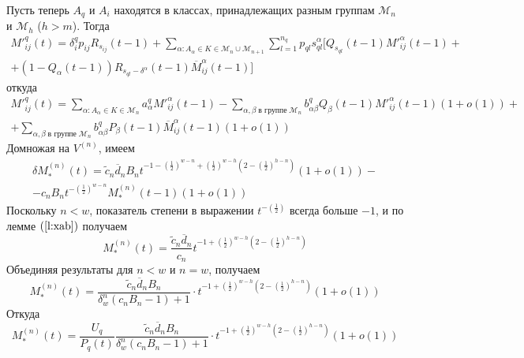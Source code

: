 \documentclass[12pt]{article}
\begin{document}
Пусть теперь $A_q$ и $A_i$ находятся в классах, принадлежащих разным группам $\mathcal{M}_n$ и $\mathcal{M}_h$ ($h > m$). Тогда
\begin{multline*}
	M'^q_{ij}(t) = \delta^q_i p_{ij} R_{s_{ij}}(t-1) + \sum_{\alpha: A_\alpha \in K \in \mathcal{M}_n \cup \mathcal{M}_{n+1}} \sum_{l=1}^{n_q} p_{ql} s_{ql}^\alpha [Q_{s_{ql}}(t-1) M'^\alpha_{ij}(t-1) + \\
	+ (1 - Q_\alpha(t-1)) R_{s_{ql} - \delta^\alpha}(t-1) \overline{M}^{\alpha}_{ij}(t-1)]
\end{multline*}
откуда
\begin{multline*}
	M'^q_{ij}(t) = \sum_{\alpha : A_\alpha \in K \in \mathcal{M}_n} a^q_\alpha M'^\alpha_{ij}(t-1) - \sum_{\alpha,\beta\; \text{в группе}\; \mathcal{M}_n} b^q_{\alpha \beta} Q_\beta(t-1) M'^\alpha_{ij}(t-1) (1 + o(1)) + \\
	+ \sum_{\alpha,\beta\; \text{в группе}\; \mathcal{M}_n} b^q_{\alpha \beta} P_\beta(t-1) \overline{M}^\alpha_{ij}(t-1) (1 + o(1))
\end{multline*}
Домножая на $V^{(n)}$, имеем
\begin{multline*}
	\delta M^{(n)}_*(t) = \tilde{c}_n \overline{d}_n B_n t^{-1 -\left(\frac{1}{2}\right)^{w-n} + \left(\frac{1}{2}\right)^{w-h} \left(2 - \left(\frac{1}{2}\right)^{h - n}\right)} (1 + o(1)) - \\
	- c_n B_n t^{-\left(\frac{1}{2}\right)^{w-n}} M^{(n)}_*(t-1) (1 + o(1))
\end{multline*}
Поскольку $n < w$, показатель степени в выражении $t^{-\left(\frac{1}{2}\right)}$ всегда больше $-1$, и по лемме $(\ref{l:xab})$ получаем
\begin{equation*}
	M^{(n)}_*(t) = \frac{\tilde{c}_n \overline{d}_n}{c_n} t^{-1 + \left(\frac{1}{2}\right)^{w-h} \left(2 - \left(\frac{1}{2}\right)^{h-n}\right)}
\end{equation*}
Объединяя результаты для $n < w$ и $n = w$, получаем
\begin{equation*}
	M^{(n)}_*(t) = \frac{\tilde{c}_n \overline{d}_n B_n}{\delta^n_w (c_n B_n - 1) + 1} \cdot t^{-1 + \left(\frac{1}{2}\right)^{w-h} \left(2 - \left(\frac{1}{2}\right)^{h-n} \right)} (1 + o(1))
\end{equation*}
Откуда
\begin{equation*}
	M^{(n)}_*(t) = \frac{U_q}{P_q(t)} \frac{\tilde{c}_n \overline{d}_n B_n}{\delta^n_w (c_n B_n - 1) + 1} \cdot t^{-1 + \left(\frac{1}{2}\right)^{w-h} \left(2 - \left(\frac{1}{2}\right)^{h-n} \right)} (1 + o(1))
\end{equation*}
\end{document}
